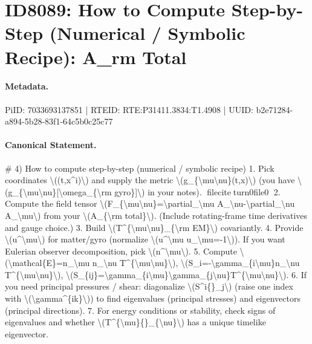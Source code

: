\section*{ID8089: How to Compute Step-by-Step (Numerical / Symbolic Recipe): A\_rm Total}
\paragraph{Metadata.}
PiID: 7033693137851 | RTEID: RTE:P31411.3834:T1.4908 | UUID: b2e71284-a894-5b28-83f1-64c5b0c25c77

\paragraph{Canonical Statement.}
\# 4) How to compute step-by-step (numerical / symbolic recipe) 1. Pick coordinates \textbackslash{}((t,x\textasciicircum{}i)\textbackslash{}) and supply the metric \textbackslash{}(g\_\{\textbackslash{}mu\textbackslash{}nu\}(t,x)\textbackslash{}) (you have \textbackslash{}(g\_\{\textbackslash{}mu\textbackslash{}nu\}[\textbackslash{}omega\_\{\textbackslash{}rm gyro\}]\textbackslash{}) in your notes). fileciteturn0file0 2. Compute the field tensor \textbackslash{}(F\_\{\textbackslash{}mu\textbackslash{}nu\}=\textbackslash{}partial\_\textbackslash{}mu A\_\textbackslash{}nu-\textbackslash{}partial\_\textbackslash{}nu A\_\textbackslash{}mu\textbackslash{}) from your \textbackslash{}(A\_\{\textbackslash{}rm total\}\textbackslash{}). (Include rotating-frame time derivatives and gauge choice.) 3. Build \textbackslash{}(T\textasciicircum{}\{\textbackslash{}mu\textbackslash{}nu\}\_\{\textbackslash{}rm EM\}\textbackslash{}) covariantly. 4. Provide \textbackslash{}(u\textasciicircum{}\textbackslash{}mu\textbackslash{}) for matter/gyro (normalize \textbackslash{}(u\textasciicircum{}\textbackslash{}mu u\_\textbackslash{}mu=-1\textbackslash{})). If you want Eulerian observer decomposition, pick \textbackslash{}(n\textasciicircum{}\textbackslash{}mu\textbackslash{}). 5. Compute \textbackslash{}(\textbackslash{}mathcal\{E\}=n\_\textbackslash{}mu n\_\textbackslash{}nu T\textasciicircum{}\{\textbackslash{}mu\textbackslash{}nu\}\textbackslash{}), \textbackslash{}(S\_i=-\textbackslash{}gamma\_\{i\textbackslash{}mu\}n\_\textbackslash{}nu T\textasciicircum{}\{\textbackslash{}mu\textbackslash{}nu\}\textbackslash{}), \textbackslash{}(S\_\{ij\}=\textbackslash{}gamma\_\{i\textbackslash{}mu\}\textbackslash{}gamma\_\{j\textbackslash{}nu\}T\textasciicircum{}\{\textbackslash{}mu\textbackslash{}nu\}\textbackslash{}). 6. If you need principal pressures / shear: diagonalize \textbackslash{}(S\textasciicircum{}i\{\}\_j\textbackslash{}) (raise one index with \textbackslash{}(\textbackslash{}gamma\textasciicircum{}\{ik\}\textbackslash{})) to find eigenvalues (principal stresses) and eigenvectors (principal directions). 7. For energy conditions or stability, check signs of eigenvalues and whether \textbackslash{}(T\textasciicircum{}\{\textbackslash{}mu\}\{\}\_\{\textbackslash{}nu\}\textbackslash{}) has a unique timelike eigenvector.

